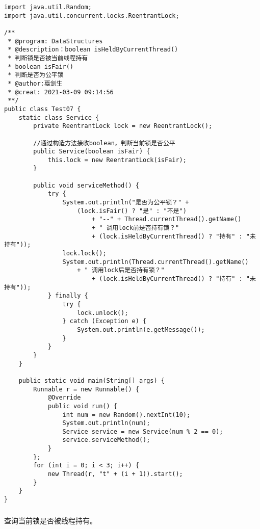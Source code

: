 \documentclass[a4paper]{report}
\begin{document}
\begin{Verbatim}[frame=single,numbersep=5pt,xleftmargin=1.5em,xrightmargin=1.5em]
import java.util.Random;
import java.util.concurrent.locks.ReentrantLock;

/**
 * @program: DataStructures
 * @description：boolean isHeldByCurrentThread()
 * 判断锁是否被当前线程持有
 * boolean isFair()
 * 判断是否为公平锁
 * @author:戛剑生
 * @creat: 2021-03-09 09:14:56
 **/
public class Test07 {
    static class Service {
        private ReentrantLock lock = new ReentrantLock();

        //通过构造方法接收boolean，判断当前锁是否公平
        public Service(boolean isFair) {
            this.lock = new ReentrantLock(isFair);
        }

        public void serviceMethod() {
            try {
                System.out.println("是否为公平锁？" +
                    (lock.isFair() ? "是" : "不是")
                        + "--" + Thread.currentThread().getName()
                        + " 调用lock前是否持有锁？"
                        + (lock.isHeldByCurrentThread() ? "持有" : "未持有"));
                lock.lock();
                System.out.println(Thread.currentThread().getName()
                    + " 调用lock后是否持有锁？"
                        + (lock.isHeldByCurrentThread() ? "持有" : "未持有"));
            } finally {
                try {
                    lock.unlock();
                } catch (Exception e) {
                    System.out.println(e.getMessage());
                }
            }
        }
    }

    public static void main(String[] args) {
        Runnable r = new Runnable() {
            @Override
            public void run() {
                int num = new Random().nextInt(10);
                System.out.println(num);
                Service service = new Service(num % 2 == 0);
                service.serviceMethod();
            }
        };
        for (int i = 0; i < 3; i++) {
            new Thread(r, "t" + (i + 1)).start();
        }
    }
}\end{Verbatim}

\subsubsection{}
查询当前锁是否被线程持有。
\end{document}
